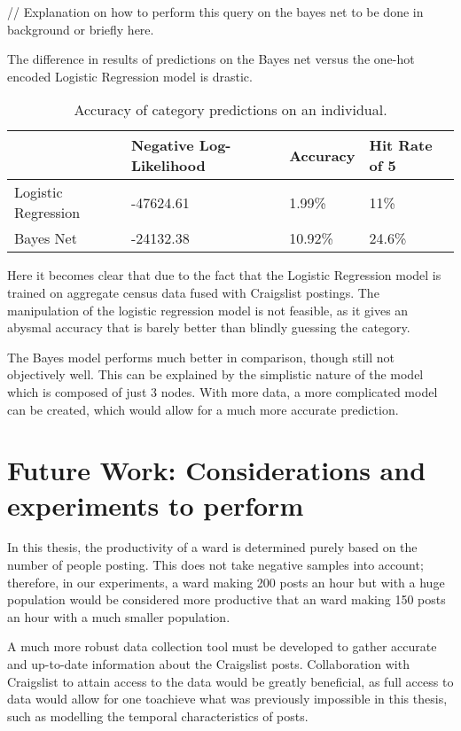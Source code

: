 \documentclass[12pt]{article}
\begin{document}
// Explanation on how to perform this query on the bayes net to be done in background or briefly here. 

The difference in results of predictions on the Bayes net versus the one-hot encoded Logistic Regression model is drastic. 

\begin{table}[]
\centering
\begin{tabular}{l|l|l|l|}
\cline{2-4}
 & Negative Log-Likelihood & Accuracy & Hit Rate of 5 \\ \hline
\multicolumn{1}{|l|}{Logistic Regression} & -47624.61 & 1.99\% & 11\% \\ \hline
\multicolumn{1}{|l|}{Bayes Net} & -24132.38 & 10.92\% & 24.6\% \\ \hline
\end{tabular}
\caption{Accuracy of category predictions on an individual.}
\label{my-label}
\end{table}

Here it becomes clear that due to the fact that the Logistic Regression model is trained on aggregate census data fused with Craigslist postings. The manipulation of the logistic regression model is not feasible, as it gives an abysmal accuracy that is barely better than blindly guessing the category. 

The Bayes model performs much better in comparison, though still not objectively well. This can be explained by the simplistic nature of the model which is composed of just 3 nodes. With more data, a more complicated model can be created, which would allow for a much more accurate prediction. 
  

\newpage
\section{Future Work: Considerations and experiments to perform}
In this thesis, the productivity of a ward is determined purely based on the number of people posting. This does not take negative samples into account; therefore, in our experiments, a ward making 200 posts an hour but with a huge population would be considered more productive that an ward making 150 posts an hour with a much smaller population. 

A much more robust data collection tool must be developed to gather accurate and up-to-date information about the Craigslist posts. Collaboration with Craigslist to attain access to the data would be greatly beneficial, as full access to data would allow for one toachieve what was previously impossible in this thesis, such as modelling the temporal characteristics of posts. 
\end{document}
